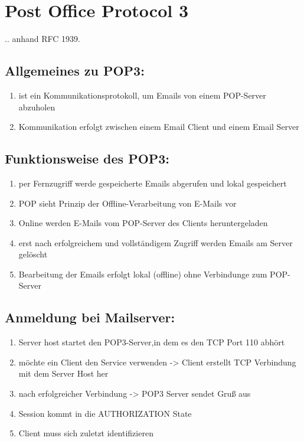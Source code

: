 \documentclass[11pt]{article}
\begin{document}
    \section{Post Office Protocol 3}
    .. anhand RFC 1939.

    \subsection{Allgemeines zu POP3:}
    \begin{enumerate}

        \item ist ein Kommunikationsprotokoll, um Emails von einem POP-Server abzuholen
        \item Kommunikation erfolgt zwischen einem Email Client und einem Email Server

    \end{enumerate}

    \subsection{Funktionsweise des POP3:}

    \begin{enumerate}

        \item per Fernzugriff werde gespeicherte Emails abgerufen und lokal gespeichert
        \item POP sieht Prinzip der Offline-Verarbeitung von E-Mails vor
        \item Online werden E-Mails vom POP-Server des Clients heruntergeladen
        \item erst nach erfolgreichem und vollständigem Zugriff werden Emails am Server gelöscht
        \item Bearbeitung der Emails erfolgt lokal (offline) ohne Verbindunge zum POP-Server

    \end{enumerate}

    \subsection{Anmeldung bei Mailserver:}
    \begin{enumerate}

        \item Server host startet den POP3-Server,in dem es den TCP Port 110 abhört
        \item möchte ein Client den Service verwenden -> Client erstellt TCP
        Verbindung mit dem Server Host her
        \item nach erfolgreicher Verbindung -> POP3 Server sendet Gruß aus
        \item Session kommt in die AUTHORIZATION State
        \item Client muss sich zuletzt identifizieren

    \end{enumerate}
\end{document}
